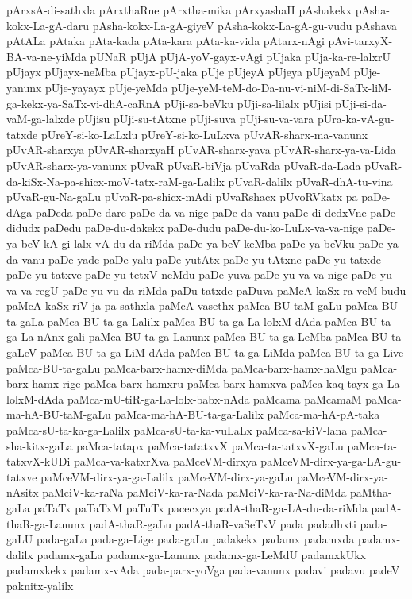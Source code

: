 {pArxsA-di-sathxla
pArxthaRne
pArxtha-mika
pArxyashaH
pAshakekx
pAsha-kokx-La-gA-daru
pAsha-kokx-La-gA-giyeV
pAsha-kokx-La-gA-gu-vudu
pAshava
pAtALa
pAtaka
pAta-kada
pAta-kara
pAta-ka-vida
pAtarx-nAgi
pAvi-tarxyX-BA-va-ne-yiMda
pUNaR
pUjA
pUjA-yoV-gayx-vAgi
pUjaka
pUja-ka-re-lalxrU
pUjayx
pUjayx-neMba
pUjayx-pU-jaka
pUje
pUjeyA
pUjeya
pUjeyaM
pUje-yanunx
pUje-yayayx
pUje-yeMda
pUje-yeM-teM-do-Da-nu-vi-niM-di-SaTx-liM-ga-kekx-ya-SaTx-vi-dhA-caRnA
pUji-sa-beVku
pUji-sa-lilalx
pUjisi
pUji-si-da-vaM-ga-lalxde
pUjisu
pUji-su-tAtxne
pUji-suva
pUji-su-va-vara
pUra-ka-vA-gu-tatxde
pUreY-si-ko-LaLxlu
pUreY-si-ko-LuLxva
pUvAR-sharx-ma-vanunx
pUvAR-sharxya
pUvAR-sharxyaH
pUvAR-sharx-yava
pUvAR-sharx-ya-va-Lida
pUvAR-sharx-ya-vanunx
pUvaR
pUvaR-biVja
pUvaRda
pUvaR-da-Lada
pUvaR-da-kiSx-Na-pa-shicx-moV-tatx-raM-ga-Lalilx
pUvaR-dalilx
pUvaR-dhA-tu-vina
pUvaR-gu-Na-gaLu
pUvaR-pa-shicx-mAdi
pUvaRshacx
pUvoRVkatx
pa
paDe-dAga
paDeda
paDe-dare
paDe-da-va-nige
paDe-da-vanu
paDe-di-dedxVne
paDe-didudx
paDedu
paDe-du-dakekx
paDe-dudu
paDe-du-ko-LuLx-va-va-nige
paDe-ya-beV-kA-gi-lalx-vA-du-da-riMda
paDe-ya-beV-keMba
paDe-ya-beVku
paDe-ya-da-vanu
paDe-yade
paDe-yalu
paDe-yutAtx
paDe-yu-tAtxne
paDe-yu-tatxde
paDe-yu-tatxve
paDe-yu-tetxV-neMdu
paDe-yuva
paDe-yu-va-va-nige
paDe-yu-va-va-regU
paDe-yu-vu-da-riMda
paDu-tatxde
paDuva
paMcA-kaSx-ra-veM-budu
paMcA-kaSx-riV-ja-pa-sathxla
paMcA-vasethx
paMca-BU-taM-gaLu
paMca-BU-ta-gaLa
paMca-BU-ta-ga-Lalilx
paMca-BU-ta-ga-La-lolxM-dAda
paMca-BU-ta-ga-La-nAnx-gali
paMca-BU-ta-ga-Lanunx
paMca-BU-ta-ga-LeMba
paMca-BU-ta-gaLeV
paMca-BU-ta-ga-LiM-dAda
paMca-BU-ta-ga-LiMda
paMca-BU-ta-ga-Live
paMca-BU-ta-gaLu
paMca-barx-hamx-diMda
paMca-barx-hamx-haMgu
paMca-barx-hamx-rige
paMca-barx-hamxru
paMca-barx-hamxva
paMca-kaq-tayx-ga-La-lolxM-dAda
paMca-mU-tiR-ga-La-lolx-babx-nAda
paMcama
paMcamaM
paMca-ma-hA-BU-taM-gaLu
paMca-ma-hA-BU-ta-ga-Lalilx
paMca-ma-hA-pA-taka
paMca-sU-ta-ka-ga-Lalilx
paMca-sU-ta-ka-vuLaLx
paMca-sa-kiV-lana
paMca-sha-kitx-gaLa
paMca-tatapx
paMca-tatatxvX
paMca-ta-tatxvX-gaLu
paMca-ta-tatxvX-kUDi
paMca-va-katxrXva
paMceVM-dirxya
paMceVM-dirx-ya-ga-LA-gu-tatxve
paMceVM-dirx-ya-ga-Lalilx
paMceVM-dirx-ya-gaLu
paMceVM-dirx-ya-nAsitx
paMciV-ka-raNa
paMciV-ka-ra-Nada
paMciV-ka-ra-Na-diMda
paMtha-gaLa
paTaTx
paTaTxM
paTuTx
pacecxya
padA-thaR-ga-LA-du-da-riMda
padA-thaR-ga-Lanunx
padA-thaR-gaLu
padA-thaR-vaSeTxV
pada
padadhxti
pada-gaLU
pada-gaLa
pada-ga-Lige
pada-gaLu
padakekx
padamx
padamxda
padamx-dalilx
padamx-gaLa
padamx-ga-Lanunx
padamx-ga-LeMdU
padamxkUkx
padamxkekx
padamx-vAda
pada-parx-yoVga
pada-vanunx
padavi
padavu
padeV
paknitx-yalilx
}

